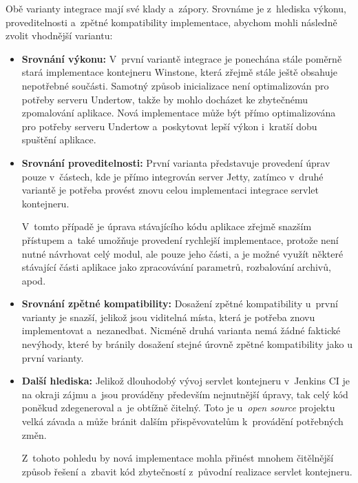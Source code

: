             \noindent Obě varianty integrace mají své klady a~zápory. 
            Srovnáme je z~hlediska výkonu, proveditelnosti a~zpětné kompatibility
            implementace, abychom mohli následně zvolit vhodnější variantu:

            \begin{itemize}
                \item{\textbf{Srovnání výkonu:} V~první variantě integrace je ponechána stále
                 poměrně stará implementace kontejneru Winstone, která zřejmě stále ještě
                 obsahuje nepotřebné součásti. Samotný způsob inicializace není optimalizován
                 pro potřeby serveru Undertow, takže by mohlo docházet ke zbytečnému
                 zpomalování aplikace.
                 Nová implementace může být přímo optimalizována pro potřeby 
                 serveru Undertow a~poskytovat lepší výkon i~kratší dobu spuštění aplikace.}

                \item{\textbf{Srovnání proveditelnosti:} První varianta představuje provedení 
                    úprav pouze v~částech, kde je přímo integrován server Jetty, 
                    zatímco v~druhé variantě je potřeba provést znovu celou implementaci
                    integrace servlet kontejneru. 
                                         
                    V~tomto případě je úprava stávajícího kódu aplikace
                    zřejmě snazším přístupem a~také umožňuje provedení rychlejší
                    implementace, protože není nutné návrhovat celý modul,
                    ale pouze jeho části, a je možné využít některé stávající části aplikace
                    jako zpracovávání parametrů, rozbalování archivů, apod.}

                \item{\textbf{Srovnání zpětné kompatibility:} Dosažení zpětné kompatibility
                    u~první varianty je snazší, jelikož jsou viditelná místa, která je 
                    potřeba znovu implementovat a~nezanedbat. Nicméně druhá varianta
                    nemá žádné faktické nevýhody, které by bránily dosažení 
                    stejné úrovně zpětné kompatibility jako u první varianty.}

                \item{\textbf{Další hlediska:} Jelikož dlouhodobý vývoj servlet kontejneru
                    v~Jenkins CI je na okraji zájmu a~jsou prováděny především nejnutnější úpravy, 
                    tak celý kód poněkud zdegeneroval a~je obtížně čitelný. Toto
                    je u~\emph{open source} projektu velká závada 
                    a může bránit dalším přispěvovatelům k~provádění potřebných změn.

                    Z~tohoto pohledu by nová implementace mohla přinést mnohem čitělnější
                    způsob řešení a~zbavit kód zbytečností z~původní realizace servlet kontejneru.}
            \end{itemize}



